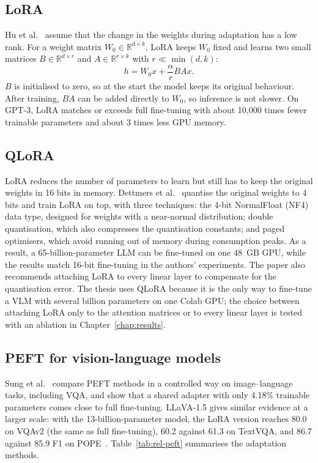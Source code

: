 \subsection{LoRA}

Hu et al.~\cite{hu2022lora} assume that the change in the weights during adaptation
has a low rank. For a weight matrix $W_0 \in \mathbb{R}^{d \times k}$, LoRA keeps $W_0$
fixed and learns two small matrices $B \in \mathbb{R}^{d \times r}$ and
$A \in \mathbb{R}^{r \times k}$ with $r \ll \min(d, k)$:
\begin{equation}
  h = W_0 x + \frac{\alpha}{r} B A x .
  \label{eq:lora}
\end{equation}
$B$ is initialised to zero, so at the start the model keeps its original behaviour.
After training, $BA$ can be added directly to $W_0$, so inference is not slower. On
GPT-3, LoRA matches or exceeds full fine-tuning with about 10,000 times fewer trainable
parameters and about 3 times less GPU memory.

\subsection{QLoRA}

LoRA reduces the number of parameters to learn but still has to keep the original
weights in 16 bits in memory. Dettmers et al.~\cite{dettmers2023qlora} quantise the
original weights to 4 bits and train LoRA on top, with three techniques: the 4-bit
NormalFloat (NF4) data type, designed for weights with a near-normal distribution;
double quantisation, which also compresses the quantisation constants; and paged
optimisers, which avoid running out of memory during consumption peaks. As a result,
a 65-billion-parameter LLM can be fine-tuned on one 48~GB GPU, while the results match
16-bit fine-tuning in the authors' experiments. The paper also recommends attaching LoRA
to every linear layer to compensate for the quantisation error. The thesis uses QLoRA
because it is the only way to fine-tune a VLM with several billion parameters on one
Colab GPU; the choice between attaching LoRA only to the attention matrices or to every
linear layer is tested with an ablation in Chapter~\ref{chap:results}.

\subsection{PEFT for vision-language models}

Sung et al.~\cite{sung2022vladapter} compare PEFT methods in a controlled way on
image--language tasks, including VQA, and show that a shared adapter with only 4.18\%
trainable parameters comes close to full fine-tuning. LLaVA-1.5 gives similar evidence
at a larger scale: with the 13-billion-parameter model, the LoRA version reaches 80.0 on
VQAv2 (the same as full fine-tuning), 60.2 against 61.3 on TextVQA, and 86.7 against
85.9 F1 on POPE~\cite{liu2024llava15}. Table~\ref{tab:rel-peft} summarises the
adaptation methods.

